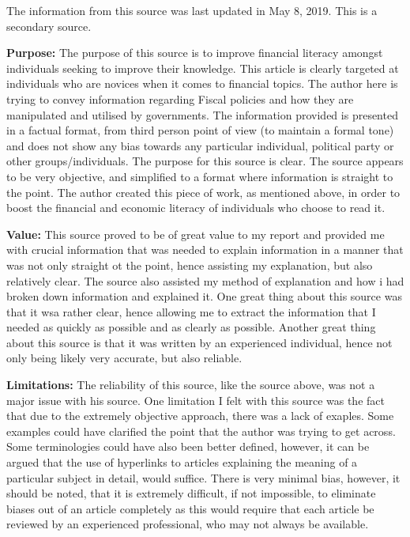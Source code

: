\documentclass[12pt, a4paper]{article}
\begin{document}
			The information from this source was last updated in May 8, 2019. This is a secondary source. 
			\newline
			
			\textbf{Purpose:}
			\newline
			The purpose of this source is to improve financial literacy amongst individuals seeking to improve their knowledge. This article is clearly targeted at individuals who are novices when it comes to financial topics. The author here is trying to convey information regarding Fiscal policies and how they are manipulated and utilised by governments. The information provided is presented in a factual format, from third person point of view (to maintain a formal tone) and does not show any bias towards any particular individual, political party or other groups/individuals. The purpose for this source is clear. The source appears to be very objective, and simplified to a format where information is straight to the point. The author created this piece of work, as mentioned above, in order to boost the financial and economic literacy of individuals who choose to read it. 
			\newline
			‌
			
			\textbf{Value:}	
			\newline
			This source proved to be of great value to my report and provided me with crucial information that was needed to explain information in a manner that was not only straight ot the point, hence assisting my explanation, but also relatively clear. The source also assisted my method of explanation and how i had broken down information and explained it. One great thing about this source was that it wsa rather clear, hence allowing me to extract the information that I needed as quickly as possible and as clearly as possible. Another great thing about this source is that it was written by an experienced individual, hence not only being likely very accurate, but also reliable.
			\newline
			
			
			\textbf{Limitations:}
			\newline
			The reliability of this source, like the source above, was not a major issue with his source. One limitation I felt with this source was the fact that due to the extremely objective approach, there was a lack of exaples. Some examples could have clarified the point that the author was trying to get across. Some terminologies could have also been better defined, however, it can be argued that the use of hyperlinks to articles explaining the meaning of a particular subject in detail, would suffice. There is very minimal bias, however, it should be noted, that it is extremely difficult, if not impossible, to eliminate biases out of an article completely as this would require that each article be reviewed by an experienced professional, who may not always be available.
\end{document}
